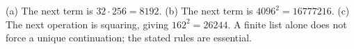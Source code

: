 (a) The next term is $32\cdot256=\boxed{8192}$. (b) The next term is $4096^2=\boxed{16777216}$. (c) The next operation is squaring, giving $162^2=\boxed{26244}$. A finite list alone does not force a unique continuation; the stated rules are essential.
